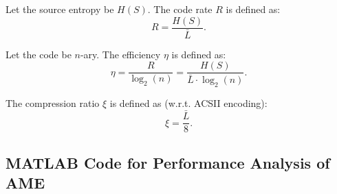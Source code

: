 \documentclass[12pt,twoside]{article}
\begin{document}
\begin{appendices}
Let the source entropy be $H(S)$. The code rate $R$ is defined as:
\begin{equation}
    R = \frac{H(S)}{\bar{L}}.
\end{equation}

Let the code be $n$-ary. The efficiency $\eta$ is defined as:
\begin{equation}
    \eta = \frac{R}{\log_2(n)} = \frac{H(S)}{\bar{L} \cdot \log_2(n)}.
\end{equation}

The compression ratio $\xi$ is defined as (w.r.t. ACSII encoding):
\begin{equation}
    \xi = \frac{\bar{L}}{8}.
\end{equation}

\newpage
\subsection{MATLAB Code for Performance Analysis of AME}
\label{app:performanceAME}



\end{appendices}
\end{document}
